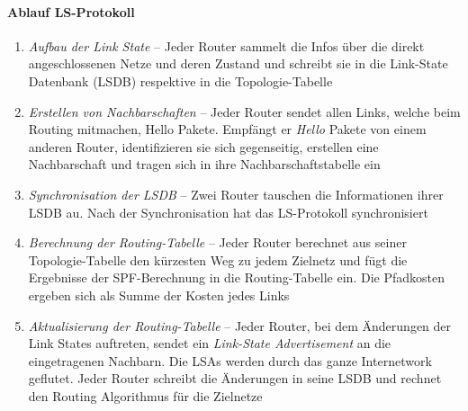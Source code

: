 \documentclass[a4paper,12pt]{article}
\begin{document}
\paragraph{Ablauf LS-Protokoll}
\begin{enumerate}
\item \emph{Aufbau der Link State} -- Jeder Router sammelt die Infos über die direkt angeschlossenen Netze und deren Zustand und schreibt sie in die Link-State Datenbank (LSDB) respektive in die Topologie-Tabelle
\item \emph{Erstellen von Nachbarschaften} -- Jeder Router sendet allen Links, welche beim Routing mitmachen, Hello Pakete. Empfängt er \emph{Hello} Pakete von einem anderen Router, identifizieren sie sich gegenseitig, erstellen eine Nachbarschaft und tragen sich in ihre Nachbarschaftstabelle ein
\item \emph{Synchronisation der LSDB} -- Zwei Router tauschen die Informationen ihrer LSDB au. Nach der Synchronisation hat das LS-Protokoll synchronisiert
\item \emph{Berechnung der Routing-Tabelle} -- Jeder Router berechnet aus seiner Topologie-Tabelle den kürzesten Weg zu jedem Zielnetz und fügt die Ergebnisse der SPF-Berechnung in die Routing-Tabelle ein. Die Pfadkosten ergeben sich als Summe der Kosten jedes Links
\item \emph{Aktualisierung der Routing-Tabelle} -- Jeder Router, bei dem Änderungen der Link States auftreten, sendet ein \emph{Link-State Advertisement} an die eingetragenen Nachbarn. Die LSAs werden durch das ganze Internetwork geflutet. Jeder Router schreibt die Änderungen in seine LSDB und rechnet den Routing Algorithmus für die Zielnetze
\end{enumerate}
\end{document}
